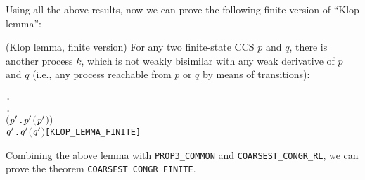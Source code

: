 Using all the above results, now we can prove the following finite
version of ``Klop lemma'':
\begin{lemma}{(Klop lemma,  finite version)}
\label{lem:klop-lemma-finite}
For any two finite-state CCS $p$ and $q$, there is another process
$k$, which is not weakly bisimilar 
with
 any weak derivative  of $p$
and $q$ (i.e., any process reachable from $p $ or $q$ by means of transitions):
\begin{alltt}
\HOLTokenTurnstile{} \HOLSymConst{\HOLTokenForall{}} .
         \HOLSymConst{\HOLTokenConj{}}   \HOLSymConst{\HOLTokenImp{}}
       \HOLSymConst{\HOLTokenExists{}}.
             \HOLSymConst{\HOLTokenConj{}} \ensuremath{(}\HOLSymConst{\HOLTokenForall{}}\ensuremath{\HOLBoundVar{p}\sp{\prime}} .  \HOLTokenWeakTransBegin{}\HOLTokenWeakTransEnd \ensuremath{\HOLBoundVar{p}\sp{\prime}} \HOLSymConst{\HOLTokenImp{}} \HOLSymConst{\HOLTokenNeg{}}\ensuremath{(}\ensuremath{\HOLBoundVar{p}\sp{\prime}} \HOLSymConst{\HOLTokenWeakEQ} \ensuremath{)}\ensuremath{)} \HOLSymConst{\HOLTokenConj{}}
           \HOLSymConst{\HOLTokenForall{}}\ensuremath{\HOLBoundVar{q}\sp{\prime}} .  \HOLTokenWeakTransBegin{}\HOLTokenWeakTransEnd \ensuremath{\HOLBoundVar{q}\sp{\prime}} \HOLSymConst{\HOLTokenImp{}} \HOLSymConst{\HOLTokenNeg{}}\ensuremath{(}\ensuremath{\HOLBoundVar{q}\sp{\prime}} \HOLSymConst{\HOLTokenWeakEQ} \ensuremath{)}\hfill{[KLOP_LEMMA_FINITE]}
\end{alltt}
\end{lemma}

Combining the above lemma with \texttt{PROP3_COMMON} and \texttt{COARSEST_CONGR_RL},
we can prove the theorem \texttt{COARSEST_CONGR_FINITE}.

